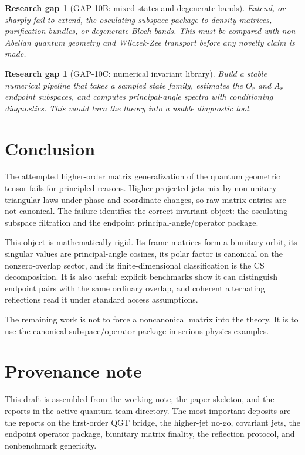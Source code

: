 \documentclass[11pt]{amsart}
\newtheorem{gap}[theorem]{Research gap}
\begin{document}
\begin{gap}[GAP-10B: mixed states and degenerate bands]
Extend, or sharply fail to extend, the osculating-subspace package to density
matrices, purification bundles, or degenerate Bloch bands. This must be compared
with non-Abelian quantum geometry and Wilczek-Zee transport before any novelty
claim is made.
\end{gap}

\begin{gap}[GAP-10C: numerical invariant library]
Build a stable numerical pipeline that takes a sampled state family, estimates
the \(O_r\) and \(A_r\) endpoint subspaces, and computes principal-angle spectra
with conditioning diagnostics. This would turn the theory into a usable
diagnostic tool.
\end{gap}

\section{Conclusion}

The attempted higher-order matrix generalization of the quantum geometric
tensor fails for principled reasons. Higher projected jets mix by non-unitary
triangular laws under phase and coordinate changes, so raw matrix entries are
not canonical. The failure identifies the correct invariant object: the
osculating subspace filtration and the endpoint principal-angle/operator
package.

This object is mathematically rigid. Its frame matrices form a biunitary orbit,
its singular values are principal-angle cosines, its polar factor is canonical
on the nonzero-overlap sector, and its finite-dimensional classification is the
CS decomposition. It is also useful: explicit benchmarks show it can distinguish
endpoint pairs with the same ordinary overlap, and coherent alternating
reflections read it under standard access assumptions.

The remaining work is not to force a noncanonical matrix into the theory. It is
to use the canonical subspace/operator package in serious physics examples.

\section*{Provenance note}

This draft is assembled from the working note, the paper skeleton, and the
reports in the active quantum team directory. The most important deposits are
the reports on the first-order QGT bridge, the higher-jet no-go, covariant jets,
the endpoint operator package, biunitary matrix finality, the reflection
protocol, and nonbenchmark genericity.
\end{document}
